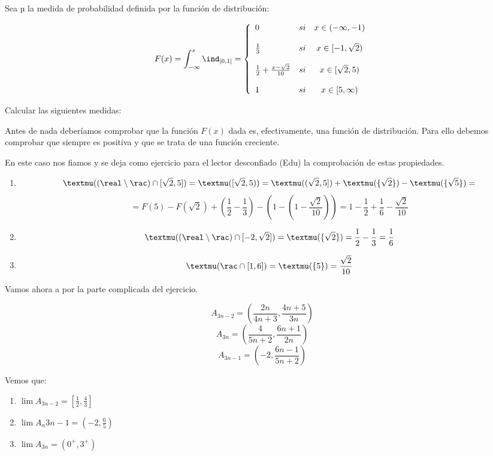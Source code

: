 \begin{problem}
Sea µ la medida de probabilidad definida por la función de distribución:

\[F(x)= \int_{-\infty}^{x} \ind_{[0,1]} = \left\{ \begin{array}{lcc}
             0 &   si  & x \in (- \infty, -1) \\
             \\ \frac{1}{3} & si &  x \in [-1, \sqrt{2}) \\
             \\ \frac{1}{2} + \frac{x-\sqrt{2}}{10} & si &  x \in [\sqrt{2}, 5) \\
             \\ 1 &  si  & x \in [5, \infty)
             \end{array}
   \right.\]

Calcular las siguientes medidas:
\solution

Antes de nada deberíamos comprobar que la función $F(x)$ dada es, efectivamente, una función de distribución. Para ello debemos comprobar que siempre es positiva y que se trata de una función creciente.

En este caso nos fiamos y se deja como ejercicio para el lector desconfiado (Edu) la comprobación de estas propiedades.
\newpage
\begin{enumerate}
\item \[µ((\real \setminus \rac)\cap[\sqrt{2}, 5]) = µ([\sqrt{2}, 5)) = µ((\sqrt{2}, 5]) + µ (\{\sqrt{2}\}) - µ (\{\sqrt{5}\}) =\]
\[ = F(5) - F(\sqrt{2}) +(\frac{1}{2}-\frac{1}{3}) -(1-(1-\frac{\sqrt{2}}{10}))=1-\frac{1}{2}+\frac{1}{6}-\frac{\sqrt{2}}{10}\]

\item \[µ((\real \setminus \rac)\cap [-2, \sqrt{2}]) = µ(\{\sqrt{2}\}) = \frac{1}{2}-\frac{1}{3} = \frac{1}{6}\]

\item \[µ(\rac \cap [1,6]) = µ(\{5\}) = \frac{\sqrt{2}}{10}\]
\end{enumerate}

Vamos ahora a por la parte complicada del ejercicio.

\[A_{3n-2} = \left(\frac{2n}{4n+3}, \frac{4n+5}{3n}\right)\]
\[A_{3n} = \left(\frac{4}{5n+2}, \frac{6n+1}{2n}\right)\]
\[A_{3n-1} = \left(-2, \frac{6n-1}{5n+2}\right)\]

Vemos que:
\begin{enumerate}
	\item $\lim A_{3n-2}= [\frac{1}{2}, \frac{4}{3}]$
	\item $\lim A_n{3n-1} = (-2, \frac{6}{5})$
	\item $\lim A_{3n} = (0^+, 3^+)$
\end{enumerate}


\end{problem}
